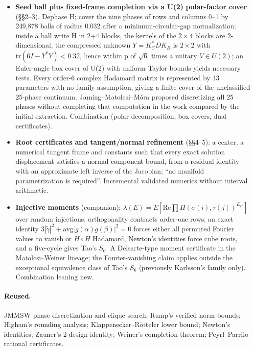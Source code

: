 \documentclass[11pt]{article}
\providecommand{\lt}{<}
\begin{document}
\begin{itemize}
\item \textbf{Seed ball plus fixed-frame completion via a U(2) polar-factor cover} (\S{}\S{}2--3). Dephase H; cover the nine phases of rows and columns 0--1 by 249,878 balls of radius 0.032 after a minimum-circular-gap normalization; inside a ball write H in 2+4 blocks, the kernels of the $2\times4$ blocks are 2-dimensional, the compressed unknown $Y=K_C^*DK_B$ is $2\times2$ with $\mathrm{tr}(6I-Y^*Y)\lt0.32$, hence within p of $\sqrt{6}$ times a unitary $V \in U(2)$; an Euler-angle box cover of U(2) with uniform Taylor bounds yields necessary tests. Every order-6 complex Hadamard matrix is represented by 13 parameters with no family assumption, giving a finite cover of the unclassified 25-phase continuum. Jaming--Matolcsi--Móra proposed discretizing all 25 phases without completing that computation in the work compared by the initial extraction. Combination (polar decomposition, box covers, dual certificates).
\item \textbf{Root certificates and tangent/normal refinement} (\S{}\S{}4--5): a center, a numerical tangent frame and constants such that every exact solution displacement satisfies a normal-component bound, from a residual identity with an approximate left inverse of the Jacobian; ``no manifold parametrization is required''. Incremental validated numerics without interval arithmetic.
\item \textbf{Injective moments} (companion): $\lambda(E)=E[\mathrm{Re}\prod H(\sigma(i),\tau(j))^{E_{ij}}]$ over random injections; orthogonality contracts order-one rows; an exact identity $3|\tilde\gamma|^2+\mathrm{avg}|g(\alpha)g(\beta)|^2=0$ forces either all permuted Fourier values to vanish or $H\circ H$ Hadamard, Newton's identities force cube roots, and a five-cycle gives Tao's $S_{6}$. A Delsarte-type moment certificate in the Matolcsi--Weiner lineage; the Fourier-vanishing claim applies outside the exceptional equivalence class of Tao's $S_6$ (previously Karlsson's family only). Combination leaning new.
\end{itemize}

\paragraph{Reused.}

JMMSW phase discretization and clique search; Rump's verified norm bounds; Higham's rounding analysis; Klappenecker--Rötteler lower bound; Newton's identities; Zauner's 2-design identity; Weiner's completion theorem; Peyrl--Parrilo rational certificates.
\end{document}
